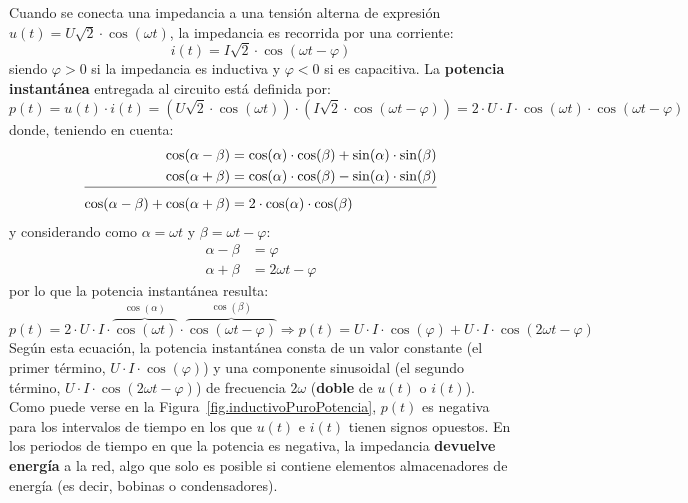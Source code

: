 Cuando se conecta una impedancia a una tensión alterna de expresión
$u(t) = U\sqrt{2} \cdot\cos (\omega t)$, la impedancia es recorrida
por una corriente:
\begin{equation*}
  i(t) = I\sqrt{2} \cdot \cos (\omega t -\varphi)
\end{equation*}
siendo $\varphi>0$ si la impedancia es inductiva y $\varphi<0$ si es
capacitiva. La \textbf{potencia instantánea} entregada al circuito
está definida por:
\begin{equation*}
  p(t)=u(t)\cdot i(t)=\left(U\sqrt{2}\cdot \cos (\omega t) \right)\cdot \left(I\sqrt{2} \cdot \cos (\omega t -\varphi)\right)=2\cdot U\cdot I\cdot \cos(\omega t)\cdot\cos(\omega t-\varphi)
\end{equation*}
donde, teniendo en cuenta:
\begin{align*}
  \cos(\alpha-\beta)&=\cos(\alpha)\cdot\cos(\beta)+\sin(\alpha)\cdot\sin(\beta)\\
  \cos(\alpha+\beta)&=\cos(\alpha)\cdot\cos(\beta)-\sin(\alpha)\cdot\sin(\beta)\\[-10pt]
  \cline{1-2}
  \cos(\alpha-\beta)+\cos(\alpha+\beta)&=2\cdot\cos(\alpha)\cdot\cos(\beta)%
\end{align*}
y considerando como $\alpha=\omega t$ y $\beta=\omega t-\varphi$:
\begin{align*}
  \alpha-\beta&=\varphi\\
  \alpha +\beta&=2\omega t-\varphi
\end{align*}
por lo que la potencia instantánea resulta:
\begin{equation}\label{eq:pot_inst}
  p(t)=2\cdot U\cdot I\cdot \overbrace{\cos(\omega t)}^{\cos(\alpha)}\cdot\overbrace{\cos(\omega t-\varphi)}^{\cos(\beta)}\Rightarrow \boxed{p(t)
    =U\cdot I \cdot \cos(\varphi)+U\cdot I \cdot\cos(2\omega t-\varphi)}
\end{equation}
Según esta ecuación, la potencia instantánea consta de un {valor
  constante} (el primer término, $U\cdot I\cdot \cos(\varphi)$) y una
componente sinusoidal (el segundo término,
$U\cdot I\cdot \cos(2 \omega t-\varphi)$) de frecuencia $2\omega$
(\textbf{doble} de $u(t)$ o $i(t)$). Como puede verse en la
Figura~\ref{fig.inductivoPuroPotencia}, $p(t)$ es negativa para los
intervalos de tiempo en los que $u(t)$ e $i(t)$ tienen signos
opuestos. En los periodos de tiempo en que la potencia es negativa, la
impedancia \textbf{devuelve energía} a la red, algo que solo es
posible si contiene elementos almacenadores de energía (es decir,
bobinas o condensadores).
	
